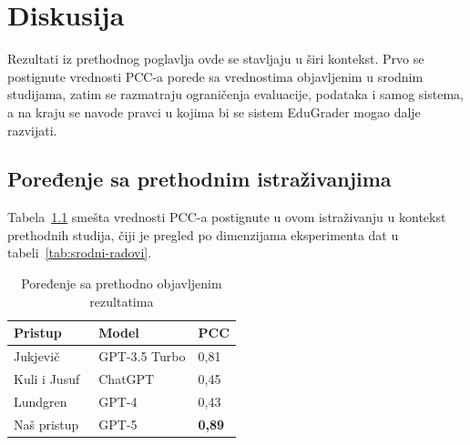 \chapter{Diskusija}
\label{sec:diskusija}

Rezultati iz prethodnog poglavlja ovde se stavljaju u širi kontekst.
Prvo se postignute vrednosti PCC-a porede sa vrednostima objavljenim u srodnim studijama,
zatim se razmatraju ograničenja evaluacije, podataka i samog sistema,
a na kraju se navode pravci u kojima bi se sistem EduGrader mogao dalje razvijati.

\section{Poređenje sa prethodnim istraživanjima}
\label{sec:poredjenje}

Tabela~\ref{tab:prior-study} smešta vrednosti PCC-a postignute u ovom istraživanju u kontekst prethodnih studija,
čiji je pregled po dimenzijama eksperimenta dat u tabeli~\ref{tab:srodni-radovi}.

\begin{table}[ht]
\centering
\caption{Poređenje sa prethodno objavljenim rezultatima}
\label{tab:prior-study}
\begin{tabular}{lll}
\toprule
Pristup & Model & PCC \\
\midrule
Jukjevič~\cite{jukiewicz2024future}       & GPT-3.5 Turbo & 0{,}81 \\
Kuli i Jusuf~\cite{kooli2025transforming} & ChatGPT       & 0{,}45 \\
Lundgren~\cite{lundgren2024large}         & GPT-4         & 0{,}43 \\
Naš pristup                               & GPT-5         & \textbf{0{,}89} \\
\bottomrule
\end{tabular}
\end{table}

